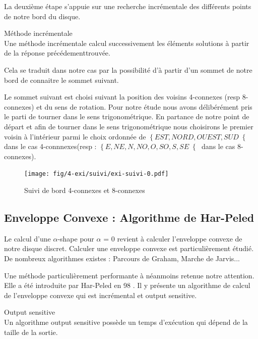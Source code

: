 La deuxième étape s'appuie sur une recherche incrémentale des différents points de notre bord du disque.

\begin{Definition}{Méthode incrémentale}\\
\label{def:os}
      Une méthode incrémentale calcul successivement les éléments solutions à partir de la réponse précédementtrouvée.
\end{Definition}
Cela se traduit dans notre cas par la possibilité d'à partir d'un sommet de notre bord de connaitre le sommet suivant.

Le sommet suivant est choisi suivant la position des voisins 4-connexes (resp 8-connexes) et du sens de rotation. Pour notre étude nous avons délibérément pris le parti de tourner dans le sens trigonométrique. En partance de notre point de départ et afin de tourner dans le sens trigonométrique nous choisirons le premier voisin à l'intérieur parmi le choix ordonnée de $\left\{EST, NORD, OUEST, SUD\right\{$ dans le cas 4-connnexes(resp :  $\left\{E, NE, N, NO, O, SO, S, SE\right\{$ dans le cas 8-connexes).

\begin{figure}[h!]
  \centering
  \texttt{[image: fig/4-exi/suivi/exi-suivi-0.pdf]}
  \caption{Suivi de bord 4-connexes et 8-connexes}
\end{figure}
  

\subsection{Enveloppe Convexe : Algorithme de Har-Peled}

Le calcul d'une $\alpha$-shape pour $\alpha$ = 0 revient à calculer l'enveloppe convexe de notre disque discret. Calculer une enveloppe convexe est particulièrement étudié. De nombreux algorithmes existes : Parcours de Graham, Marche de Jarvis... 

Une méthode particulièrement performante à néanmoins retenue notre attention. Elle a été introduite par Har-Peled en 98 \cite{HarPeled98}. Il y présente un algorithme de calcul de l'enveloppe convexe qui est incrémental et output sensitive.


\begin{Definition}{Output sensitive}\\
\label{def:os}
      Un algorithme output sensitive possède un temps d’exécution qui dépend de la taille de la sortie.
\end{Definition}

